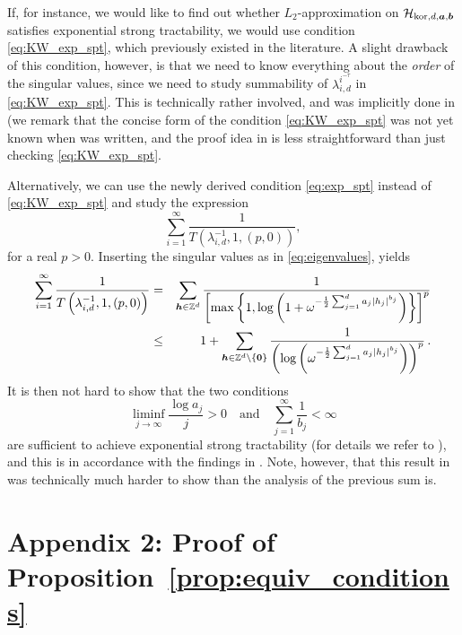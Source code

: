 \documentclass[sort&compress]{elsarticle}
\newcommand{\bsa}{\boldsymbol{a}}
\newcommand{\bsb}{\boldsymbol{b}}
\newcommand{\bsh}{\boldsymbol{h}}
\newcommand{\kor}{{\mathrm{kor}}}
\newcommand{\ZZ}{{\mathbb{Z}}}
\begin{document}
If, for instance, we would like to find out whether $L_2$-approximation on $\ch_{\kor,d,\bsa,\bsb}$ satisfies 
exponential strong tractability, we would use condition \eqref{eq:KW_exp_spt}, which previously existed in the literature. A slight drawback of this condition, however, is that we need to know everything about the \emph{order} of the singular values, since we need to study summability of $\lambda_{i,d}^{i^{-\tau}}$ in \eqref{eq:KW_exp_spt}. This is technically rather involved, and was implicitly done in \cite{DKPW14} (we remark that the concise form 
of the condition \eqref{eq:KW_exp_spt} was not yet known when \cite{DKPW14} was written, and the proof idea in \cite{DKPW14} is less 
straightforward than just checking \eqref{eq:KW_exp_spt}.

Alternatively, we can use the newly derived condition \eqref{eq:exp_spt} instead of \eqref{eq:KW_exp_spt} and study the expression
\[
 \sum_{i=1}^\infty \frac{1}{T\left(\lambda_{i,d}^{-1},1,(p,0)\right)},
\]
for a real $p>0$. Inserting the singular values as in \eqref{eq:eigenvalues}, yields
\begin{eqnarray*}
  \sum_{i=1}^\infty \frac{1}{T\left(\lambda_{i,d}^{-1},1,(p,0)\right)}
  &=&
\sum_{\bsh\in\ZZ^d}
\frac{1}{\left[\max\left\{1,\log\left(1+\omega^{-\frac{1}{2}\sum_{j=1}^d a_j \abs{h_j}^{b_j}}\right)
\right\}\right]^p}\\
&\le&1 +\sum_{\bsh\in\ZZ^d\setminus \{\boldsymbol{0}\}} \frac{1}{\left(\log \left(\omega^{-\frac{1}{2}\sum_{j=1}^d a_j \abs{h_j}^{b_j}}\right)\right)^p} \, .
\end{eqnarray*}
It is then not hard to show that the two conditions 
\[
 \liminf_{j\to\infty}\frac{\log a_j}{j}>0 \quad \mbox{and}\quad \sum_{j=1}^\infty \frac{1}{b_j} <\infty 
\]
are sufficient to achieve exponential strong tractability (for details we refer to \cite{K24}), and this is in accordance with the findings in \cite{DKPW14}. Note, however, that this result in \cite{DKPW14} was technically much harder to show than 
the analysis of the previous sum is. 


\section*{Appendix 2: Proof of Proposition~\ref{prop:equiv_conditions}}
\end{document}
